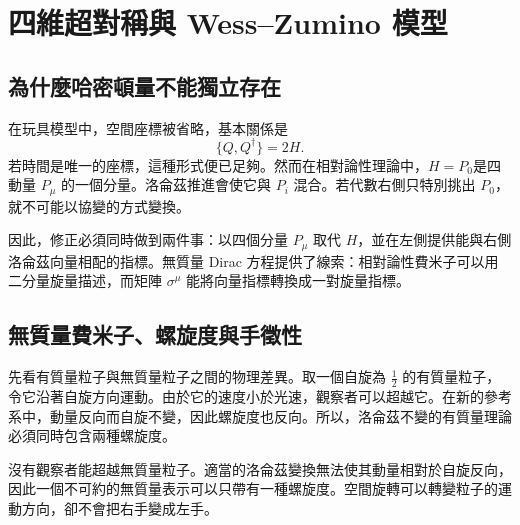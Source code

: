 \chapter{四維超對稱與 Wess--Zumino 模型}


\section{為什麼哈密頓量不能獨立存在}

在玩具模型中，空間座標被省略，基本關係是
\begin{equation}
\{Q,Q^\dagger\}=2H.
\label{eq:l8-time-only-algebra}
\end{equation}
若時間是唯一的座標，這種形式便已足夠。然而在相對論性理論中，\(H=P_0\)是四動量 \(P_\mu\) 的一個分量。洛侖茲推進會使它與 \(P_i\) 混合。若代數右側只特別挑出 \(P_0\)，就不可能以協變的方式變換。

因此，修正必須同時做到兩件事：以四個分量 \(P_\mu\) 取代 \(H\)，並在左側提供能與右側洛侖茲向量相配的指標。無質量 Dirac 方程提供了線索：相對論性費米子可以用二分量旋量描述，而矩陣 \(\sigma^\mu\) 能將向量指標轉換成一對旋量指標。

\section{無質量費米子、螺旋度與手徵性}

先看有質量粒子與無質量粒子之間的物理差異。取一個自旋為 \(\tfrac12\) 的有質量粒子，令它沿著自旋方向運動。由於它的速度小於光速，觀察者可以超越它。在新的參考系中，動量反向而自旋不變，因此螺旋度也反向。所以，洛侖茲不變的有質量理論必須同時包含兩種螺旋度。

沒有觀察者能超越無質量粒子。適當的洛侖茲變換無法使其動量相對於自旋反向，因此一個不可約的無質量表示可以只帶有一種螺旋度。空間旋轉可以轉變粒子的運動方向，卻不會把右手變成左手。

\begin{classroomqa}
\end{classroomqa}

